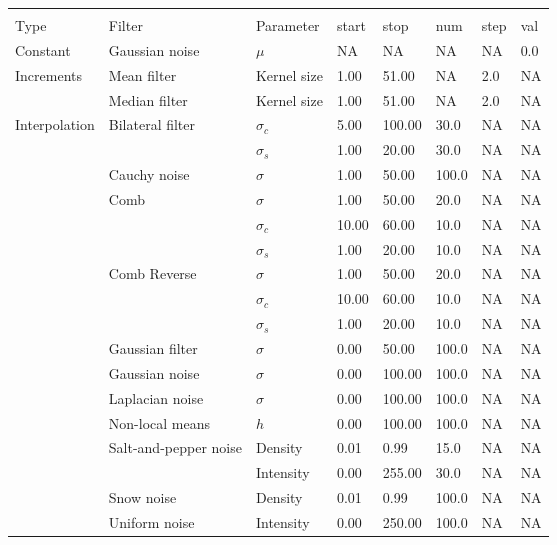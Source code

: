 \begin{tabular}{llllllll}
\toprule
              &               &           &       &        &       &    &    \\
Type & Filter & Parameter & start & stop & num & step & val \\
\midrule
Constant & Gaussian noise & $\mu$ & NA & NA & NA & NA & 0.0 \\
\cline{2-8}
\multirow{2}{*}{Increments} & Mean filter & Kernel size & 1.00  & 51.00  & NA & 2.0 & NA \\
\cline{2-8}
              & Median filter & Kernel size & 1.00  & 51.00  & NA & 2.0 & NA \\
\cline{1-8}
\multirow{17}{*}{Interpolation} & \multirow{2}{*}{Bilateral filter} & $\sigma_c$ & 5.00  & 100.00 & 30.0  & NA & NA \\
              &               & $\sigma_s$ & 1.00  & 20.00  & 30.0  & NA & NA \\
\cline{2-8}
              & Cauchy noise & $\sigma$ & 1.00  & 50.00  & 100.0 & NA & NA \\
              \cline{2-8}
              & \multirow{3}{*}{Comb} & $\sigma$ & 1.00  & 50.00  & 20.0  & NA & NA \\
              &               & $\sigma_c$ & 10.00 & 60.00  & 10.0  & NA & NA \\
              &               & $\sigma_s$ & 1.00  & 20.00  & 10.0  & NA & NA \\
\cline{2-8}
              & \multirow{3}{*}{Comb Reverse} & $\sigma$ & 1.00  & 50.00  & 20.0  & NA & NA \\
              &               & $\sigma_c$ & 10.00 & 60.00  & 10.0  & NA & NA \\
              &               & $\sigma_s$ & 1.00  & 20.00  & 10.0  & NA & NA \\
\cline{2-8}
              & Gaussian filter & $\sigma$ & 0.00  & 50.00  & 100.0 & NA & NA \\
              \cline{2-8}
              & Gaussian noise & $\sigma$ & 0.00  & 100.00 & 100.0 & NA & NA \\
              \cline{2-8}
              & Laplacian noise & $\sigma$ & 0.00  & 100.00 & 100.0 & NA & NA \\
              \cline{2-8}
              & Non-local means & $h$ & 0.00  & 100.00 & 100.0 & NA & NA \\
              \cline{2-8}
              & \multirow{2}{*}{Salt-and-pepper noise} & Density & 0.01  & 0.99   & 15.0  & NA & NA \\
              &               & Intensity & 0.00  & 255.00 & 30.0  & NA & NA \\
\cline{2-8}
              & Snow noise & Density & 0.01  & 0.99   & 100.0 & NA & NA \\
              & Uniform noise & Intensity & 0.00  & 250.00 & 100.0 & NA & NA \\
\bottomrule
\end{tabular}
